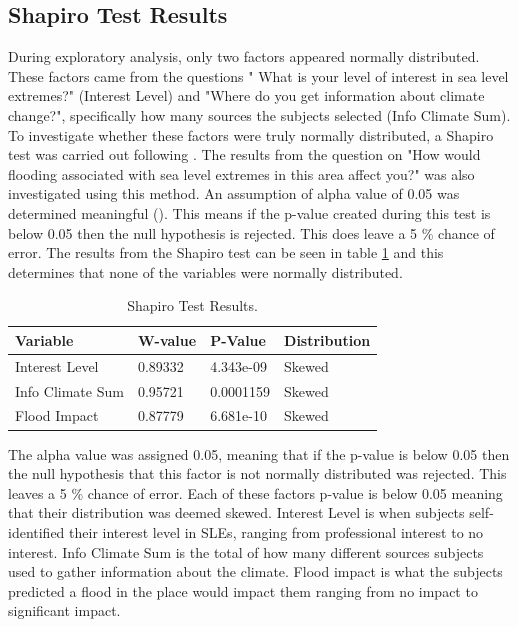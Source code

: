 \subsection{Shapiro Test Results}

During exploratory analysis, only two factors appeared normally distributed. These factors came from the questions " What is your level of interest in sea level extremes?" (Interest Level) and "Where do you get information about climate change?", specifically how many sources the subjects selected (Info Climate Sum).   To investigate whether these factors were truly normally distributed, a Shapiro test was carried out following \cite{royston_extension_1982}. The results from the question on "How would flooding associated with sea level extremes in this area affect you?" was also investigated using this method.  An assumption of alpha value of 0.05 was determined meaningful (\cite{royston_extension_1982}). This means if the p-value created during this test is below 0.05 then the null hypothesis is rejected. This does leave a 5 \% chance of error. The results from the Shapiro test can be seen in table \ref{table:shapiro_test_results} and this determines that none of the variables were normally distributed. 

\begin{table}[H]
    \centering
    \begin{tabular}{|l|l|l|l|}
    \hline
         \textbf{ Variable } &  \textbf{W-value}& \textbf{ P-Value}& \textbf{Distribution}\\ \hline
       Interest Level & 0.89332 & 4.343e-09 & Skewed \\ \hline
         Info Climate Sum  & 0.95721 & 0.0001159 & Skewed \\ \hline
        Flood Impact & 0.87779 & 6.681e-10 & Skewed \\ \hline
     \end{tabular}
    \caption{Shapiro Test Results.} {The alpha value was assigned 0.05, meaning that if the p-value is below 0.05 then the null hypothesis that this factor is not normally distributed was rejected. This leaves a 5 \% chance of error. Each of these factors p-value is below 0.05 meaning that their distribution was deemed skewed. Interest Level is when subjects self-identified their interest level in SLEs, ranging from professional interest to no interest. Info Climate Sum is the total of how many different sources subjects used to gather information about the climate. Flood impact is what the subjects predicted a flood in the place would impact them ranging from no impact to significant impact. }
    \label{table:shapiro_test_results}
\end{table}
